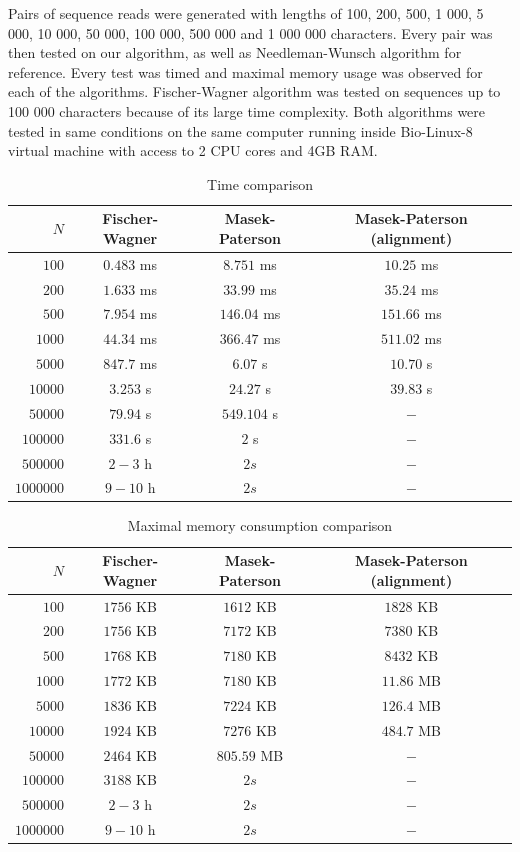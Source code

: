 \documentclass[times, utf8, seminar, numeric]{fer}
\begin{document}
Pairs of sequence reads were generated with lengths of 100, 200, 500, 1 000, 5 000, 10 000, 50 000, 100 000, 500 000 and 1 000 000 characters. Every pair was then tested on our algorithm, as well as Needleman-Wunsch algorithm for reference. Every test was timed and maximal memory usage was observed for each of the algorithms. Fischer-Wagner algorithm was tested on sequences up to 100 000 characters because of its large time complexity. Both algorithms were tested in same conditions on the same computer running inside Bio-Linux-8 virtual machine with access to 2 CPU cores and 4GB RAM.
\begin{table}[h]
\centering
\begin{tabular}{rccc}
$N$ & Fischer-Wagner & Masek-Paterson & Masek-Paterson (alignment)\\
\hline
$      100 $&$ 0.483$ ms&$ 8.751$ ms&$ 10.25$ ms \\
$      200 $&$ 1.633$ ms&$ 33.99$ ms&$ 35.24$ ms \\
$      500 $&$ 7.954$ ms&$ 146.04$ ms&$ 151.66$ ms\\
$    1 000 $&$ 44.34$ ms&$ 366.47$ ms&$ 511.02$ ms\\
$    5 000 $&$ 847.7$ ms&$ 6.07$ s&$ 10.70$ s\\
$   10 000 $&$ 3.253$ s&$ 24.27$ s&$ 39.83$ s\\
$   50 000 $&$ 79.94$ s&$ 549.104$ s&$ - $\footnotemark[2]\\
$  100 000 $&$ 331.6$ s&$ 2$ s&$ - $\footnotemark[2]\\
$  500 000 $&$ 2 - 3$ h \footnotemark[1] &$ 2s $&$ - $\footnotemark[2]\\
$1 000 000 $&$ 9 - 10$ h \footnotemark[1] &$ 2s $&$ - $\footnotemark[2]\\
\end{tabular}
\caption{Time comparison}
\end{table}
\begin{table}[h]
\centering
\begin{tabular}{rccc}
$N$ & Fischer-Wagner & Masek-Paterson & Masek-Paterson (alignment) \\
\hline
$      100 $&$ 1756$ KB &$ 1612$ KB &$ 1828$ KB \\
$      200 $&$ 1756$ KB &$ 7172$ KB &$ 7380$ KB \\
$      500 $&$ 1768$ KB &$ 7180$ KB &$ 8432$ KB \\
$    1 000 $&$ 1772$ KB &$ 7180$ KB &$ 11.86$ MB\\
$    5 000 $&$ 1836$ KB &$ 7224$ KB &$ 126.4$ MB\\
$   10 000 $&$ 1924$ KB &$ 7276$ KB &$ 484.7$ MB\\
$   50 000 $&$ 2464$ KB &$ 805.59$ MB&$ - $\footnotemark[2]\\
$  100 000 $&$ 3188$ KB &$ 2s $&$ - $\footnotemark[2]\\
$  500 000 $&$ 2 - 3$ h\footnotemark[1]&$ 2s $&$ - $\footnotemark[2]\\
$1 000 000 $&$ 9 - 10$ h\footnotemark[1]&$ 2s $&$ - $\footnotemark[2]\\
\end{tabular}
\caption{Maximal memory consumption comparison}
\end{table}
\end{document}
